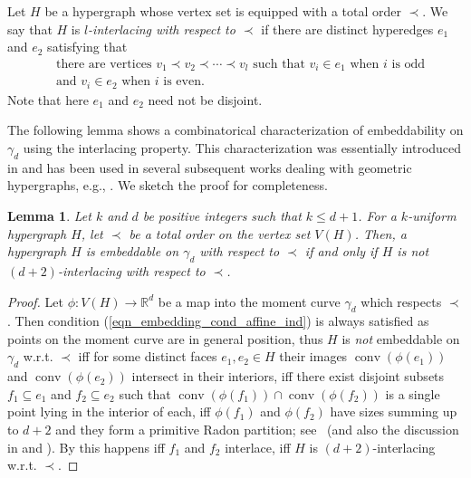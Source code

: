 \documentclass{article}
\newcommand{\RR}{\mathbb{R}}
\newtheorem{lemma}[thm]{Lemma}
\theoremstyle{definition}
\DeclareMathOperator{\conv}{conv}
\begin{document}
Let $H$ be a hypergraph whose vertex set is equipped with a total order $\prec$. We say that $H$ is \textit{$l$-interlacing with respect to $\prec$} if there are distinct hyperedges $e_1$ and $e_2$ satisfying that 
\begin{align}
    &\textrm{there are vertices $v_1\prec v_2 \prec \cdots \prec v_l$ such that $v_i \in e_1$ when $i$ is odd} \nonumber\\
    	&\textrm{and $v_i \in e_2$ when $i$ is even.} \label{cond_interlacing} 
\end{align} Note that here $e_1$ and $e_2$ need not be disjoint. 

The following lemma shows a combinatorical characterization of embeddability on $\gamma_d$ using the interlacing property. This characterization was essentially introduced in  \cite{breen1973primitive} and has been used in several subsequent works dealing with geometric hypergraphs, e.g., \cite{upper_bound_pach, anshu_rectilinear}. We sketch the proof for completeness.

\begin{lemma} \label{lemma_interlacing}
	Let $k$ and $d$ be positive integers such that $k\leq d+1$. 
	For a $k$-uniform hypergraph $H$, let $\prec$ be a total order on the vertex set $V(H)$. Then, a hypergraph $H$ is embeddable on $\gamma_d$ with respect to $\prec$ if and only if $H$ is not $(d+2)$-interlacing with respect to $\prec$.
\end{lemma}
\begin{proof}
Let $\phi:V(H)\to \RR^d$ be a map into the moment curve $\gamma_d$ which respects $\prec$. 
Then condition (\ref{eqn_embedding_cond_affine_ind}) is always satisfied as points on the moment curve are in general position, thus $H$ is \emph{not} embeddable on $\gamma_d$ w.r.t. $\prec$ iff for some distinct faces $e_1, e_2\in H$ their images $\conv(\phi(e_1))$ and $\conv(\phi(e_2))$
intersect in their interiors, iff there exist disjoint subsets $f_1\subseteq e_1$ and $f_2\subseteq e_2$ such that   
$\conv(\phi(f_1))\cap\conv(\phi(f_2))$ is a single point lying in the interior of each, iff $\phi(f_1)$ and $\phi(f_2)$ have sizes summing up to $d+2$ and they form a primitive Radon partition; see~\cite[Thm.2]{Hare-Kenelly} (and also the discussion in \cite[Chap 6]{lectures_on_polytopes_book} and \cite[Lemma 3.1]{Dey_counting_triangulations}). By  \cite[Theorem]{breen1973primitive} this happens iff $f_1$ and $f_2$ interlace, iff $H$ is $(d+2)$-interlacing w.r.t. $\prec$.
\end{proof}
\end{document}

